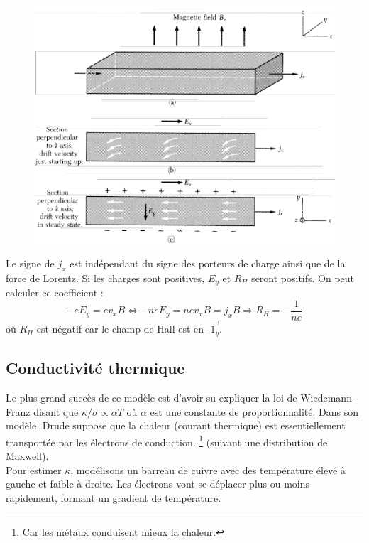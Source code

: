 \begin{figure}
	\vspace{-1cm}
	\includegraphics[scale=0.2]{ch1/image2.png}
\end{figure}
Le signe de $j_x$ est indépendant du signe des porteurs de charge ainsi que de la force
de Lorentz. Si les charges sont positives, $E_y$ et $R_H$ seront positifs. On peut 
calculer ce coefficient :
\begin{equation}
	-eE_y = ev_xB \Leftrightarrow -neE_y = nev_xB = j_xB \Longrightarrow R_H = -\frac{1}{ne}
\end{equation}
où $R_H$ est négatif car le champ de Hall est en -$\vec{1_y}$.



\newpage
\subsection{Conductivité thermique}
Le plus grand succès de ce modèle est d'avoir su expliquer la loi de 
Wiedemann-Franz disant que $\kappa/\sigma \propto \alpha T$ où $\alpha$ 
est une constante de proportionnalité. Dans son modèle, Drude suppose 
que la chaleur (courant thermique) est essentiellement transportée par
 les électrons de conduction.
\footnote{Car les métaux conduisent mieux la chaleur.} (suivant une 
distribution de Maxwell).\\
Pour estimer $\kappa$, modélisons un barreau de cuivre avec des température 
élevé à gauche et faible à droite. Les électrons vont se déplacer plus ou 
moins rapidement, formant un gradient de température. 

